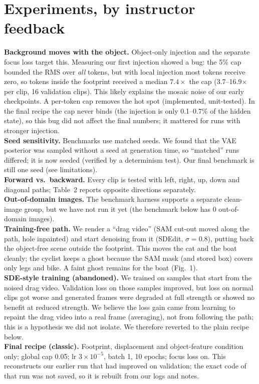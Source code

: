 \documentclass[9pt,a4paper]{extarticle}
\begin{document}
\section{Experiments, by instructor feedback}
\textbf{Background moves with the object.} Object-only injection and the separate focus loss target this. Measuring our first injection showed a bug: the 5\% cap bounded the RMS over \emph{all} tokens, but with local injection most tokens receive zero, so tokens inside the footprint received a median $7.4\times$ the cap (3.7--16.9$\times$ per clip, 16 validation clips). This likely explains the mosaic noise of our early checkpoints. A per-token cap removes the hot spot (implemented, unit-tested). In the final recipe the cap never binds (the injection is only 0.1--0.7\% of the hidden state), so this bug did not affect the final numbers; it mattered for runs with stronger injection.\\
\textbf{Seed sensitivity.} Benchmarks use matched seeds. We found that the VAE posterior was sampled without a seed at generation time, so ``matched'' runs differed; it is now seeded (verified by a determinism test). Our final benchmark is still one seed (see limitations).\\
\textbf{Forward vs.\ backward.} Every clip is tested with left, right, up, down and diagonal paths; Table~2 reports opposite directions separately.\\
\textbf{Out-of-domain images.} The benchmark harness supports a separate clean-image group, but we have not run it yet (the benchmark below has 0 out-of-domain images).\\
\textbf{Training-free path.} We render a ``drag video'' (SAM cut-out moved along the path, hole inpainted) and start denoising from it (SDEdit, $\sigma{=}0.8$), putting back the object-free scene outside the footprint. This moves the cat and the boat cleanly; the cyclist keeps a ghost because the SAM mask (and stored box) covers only legs and bike. A faint ghost remains for the boat (Fig.~1).\\
\textbf{SDE-style training (abandoned).} We trained on samples that start from the noised drag video. Validation loss on those samples improved, but loss on normal clips got worse and generated frames were degraded at full strength or showed no benefit at reduced strength. We believe the loss gain came from learning to repaint the drag video into a real frame (averaging), not from following the path; this is a hypothesis we did not isolate. We therefore reverted to the plain recipe below.\\
\textbf{Final recipe (classic).} Footprint, displacement and object-feature condition only; global cap 0.05; lr $3{\times}10^{-5}$, batch 1, 10 epochs; focus loss on. This reconstructs our earlier run that had improved on validation; the exact code of that run was not saved, so it is rebuilt from our logs and notes.
\end{document}
